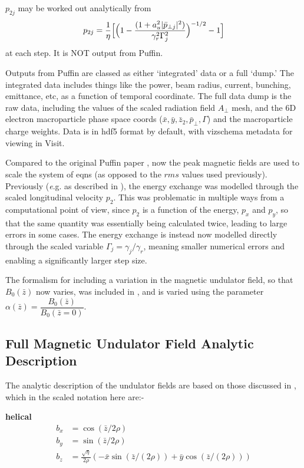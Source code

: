 \documentclass[12pt]{article}%
\begin{document}
$p_{2j}$ may be worked out analytically from
\begin{align}
p_{2j} = \frac{1}{\eta}\Bigl[ \Bigl(  1 - \frac{(1 + a_u^2 | \bar{p}_{\bot j} |^2)}{\gamma_r^2 \Gamma^2_j}  \Bigr)^{-1/2} - 1   \Bigr]
\end{align}
at each step. It is NOT output from Puffin.

Outputs from Puffin are classed as either `integrated' data or a full `dump.' The integrated data includes things like the power, beam radius, current, bunching, emittance, etc, as a function of temporal coordinate. The full data dump is the raw data, including the values of the scaled radiation field $A_\bot$ mesh, and the $6$D electron macroparticle phase space coords ($\bar{x}, \bar{y}, \bar{z}_2, \bar{p}_\bot, \Gamma$) and the macroparticle charge weights. Data is in hdf5 format by default, with vizschema metadata for viewing in Visit.

Compared to the original Puffin paper \cite{puffin}, now the peak magnetic fields are used to scale the system of eqns (as opposed to the $rms$ values used previously). Previously (\textit e.g. as described in \cite{puffin}), the energy exchange was modelled through the scaled longitudinal velocity $p_2$. This was problematic in multiple ways from a computational point of view, since $p_2$ is a function of the energy, $p_x$ and $p_y$, so that the same quantity was essentially being calculated twice, leading to large errors in some cases. The energy exchange is instead now modelled directly through the scaled variable $\Gamma_j = \gamma_j / \gamma_r$, meaning smaller numerical errors and enabling a significantly larger step size.

The formalism for including a variation in the magnetic undulator field, so that $B_0(\bar{z})$ now varies, was included in \cite{2col}, and is varied using the parameter $\alpha(\bar{z}) = \dfrac{B_0(\bar{z})}{B_0(\bar{z}=0)}$.






\subsection{Full Magnetic Undulator Field Analytic Description}

The analytic description of the undulator fields are based on those discussed in \cite{scharlemann1}, which in the scaled notation here are:-

{\bf helical}
\begin{align}
b_x  & = \cos({\bar{z}/2\rho}) \\
b_y & =  \sin({\bar{z}/2\rho}) \\
b_z & = \frac{\sqrt{\eta}}{2\rho} (-\bar{x}\sin({\bar{z} / (2 \rho)}) + \bar{y}\cos({\bar{z} / (2 \rho)}))
\end{align}
\end{document}
